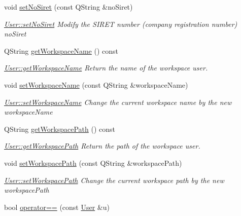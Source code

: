 \begin{DoxyCompactItemize}
void \hyperlink{classModels_1_1User_ae751ee06859dffce0cad08005c42c933}{set\+No\+Siret} (const Q\+String \&no\+Siret)
\begin{DoxyCompactList}\small\item\em \hyperlink{classModels_1_1User_ae751ee06859dffce0cad08005c42c933}{User\+::set\+No\+Siret} Modify the S\+I\+R\+E\+T number (company registration number) {\itshape no\+Siret} \end{DoxyCompactList}\item 
Q\+String \hyperlink{classModels_1_1User_adf4c52429656a4f44c15d879caee5b10}{get\+Workspace\+Name} () const 
\begin{DoxyCompactList}\small\item\em \hyperlink{classModels_1_1User_adf4c52429656a4f44c15d879caee5b10}{User\+::get\+Workspace\+Name} Return the name of the workspace user. \end{DoxyCompactList}\item 
void \hyperlink{classModels_1_1User_ae51aa34e41159fe7e4541a8cfddc50a3}{set\+Workspace\+Name} (const Q\+String \&workspace\+Name)
\begin{DoxyCompactList}\small\item\em \hyperlink{classModels_1_1User_ae51aa34e41159fe7e4541a8cfddc50a3}{User\+::set\+Workspace\+Name} Change the current workspace name by the new {\itshape workspace\+Name} \end{DoxyCompactList}\item 
Q\+String \hyperlink{classModels_1_1User_aa9421bda240316f9eebd0145f6dc3eda}{get\+Workspace\+Path} () const 
\begin{DoxyCompactList}\small\item\em \hyperlink{classModels_1_1User_aa9421bda240316f9eebd0145f6dc3eda}{User\+::get\+Workspace\+Path} Return the path of the workspace user. \end{DoxyCompactList}\item 
void \hyperlink{classModels_1_1User_ae62b6cc7c6c5f5ab80b9f066b67afc95}{set\+Workspace\+Path} (const Q\+String \&workspace\+Path)
\begin{DoxyCompactList}\small\item\em \hyperlink{classModels_1_1User_ae62b6cc7c6c5f5ab80b9f066b67afc95}{User\+::set\+Workspace\+Path} Change the current workspace path by the new {\itshape workspace\+Path} \end{DoxyCompactList}\item 
bool \hyperlink{classModels_1_1User_a60d18c2d1df053f1abf1215414f0b4b6}{operator==} (const \hyperlink{classModels_1_1User}{User} \&u)

\end{DoxyCompactItemize}
